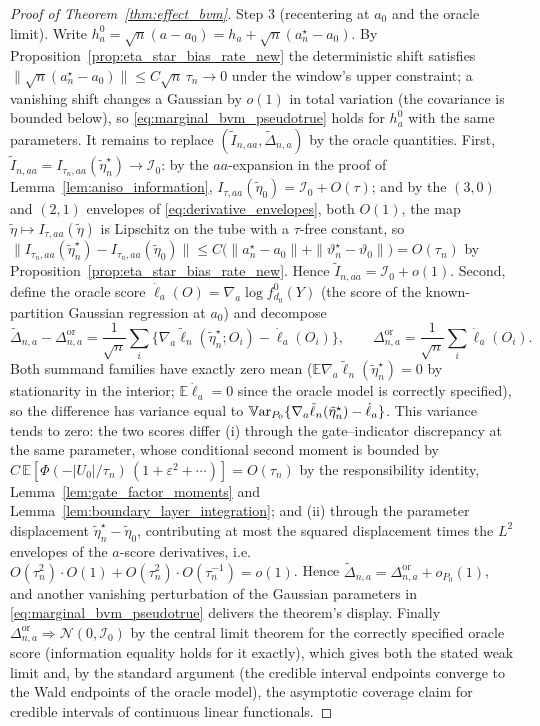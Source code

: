 \documentclass[11pt]{article}
\theoremstyle{definition}
\theoremstyle{plain}
\newcommand{\E}{\mathbb{E}}
\newcommand{\Var}{\mathbb{V}{\rm ar}}
\begin{document}
\begin{proof}[Proof of Theorem~\ref{thm:effect_bvm}]
Step 3 (recentering at $a_0$ and the oracle limit). Write $h_a^0=\sqrt n(a-a_0)=h_a+\sqrt n(a_n^\star-a_0)$. By Proposition~\ref{prop:eta_star_bias_rate_new} the deterministic shift satisfies $\|\sqrt n(a_n^\star-a_0)\|\le C\sqrt n\,\tau_n\to0$ under the window's upper constraint; a vanishing shift changes a Gaussian by $o(1)$ in total variation (the covariance is bounded below), so \eqref{eq:marginal_bvm_pseudotrue} holds for $h_a^0$ with the same parameters. It remains to replace $(\tilde I_{n,aa},\tilde\Delta_{n,a})$ by the oracle quantities. First, $\tilde I_{n,aa}=I_{\tau_n,aa}(\tilde\eta_n^\star)\to\mathcal I_0$: by the $aa$-expansion in the proof of Lemma~\ref{lem:aniso_information}, $I_{\tau,aa}(\tilde\eta_0)=\mathcal I_0+O(\tau)$; and by the $(3,0)$ and $(2,1)$ envelopes of \eqref{eq:derivative_envelopes}, both $O(1)$, the map $\tilde\eta\mapsto I_{\tau,aa}(\tilde\eta)$ is Lipschitz on the tube with a $\tau$-free constant, so
$\|I_{\tau_n,aa}(\tilde\eta_n^\star)-I_{\tau_n,aa}(\tilde\eta_0)\|\le C\big(\|a_n^\star-a_0\|+\|\vartheta_n^\star-\vartheta_0\|\big)=O(\tau_n)$
by Proposition~\ref{prop:eta_star_bias_rate_new}. Hence $\tilde I_{n,aa}=\mathcal I_0+o(1)$. Second, define the oracle score $\dot\ell_a(O)=\nabla_a\log f^0_{d_0}(Y)$ (the score of the known-partition Gaussian regression at $a_0$) and decompose
\[
\tilde\Delta_{n,a}-\Delta_{n,a}^{\mathrm{or}}
=\frac1{\sqrt n}\sum_i\big\{\nabla_a\tilde\ell_n(\tilde\eta_n^\star;O_i)-\dot\ell_a(O_i)\big\},
\qquad \Delta_{n,a}^{\mathrm{or}}=\frac1{\sqrt n}\sum_i\dot\ell_a(O_i).
\]
Both summand families have exactly zero mean ($\E\nabla_a\tilde\ell_n(\tilde\eta_n^\star)=0$ by stationarity in the interior; $\E\dot\ell_a=0$ since the oracle model is correctly specified), so the difference has variance equal to $\Var_{P_0}\{\nabla_a\tilde\ell_n(\tilde\eta_n^\star)-\dot\ell_a\}$. This variance tends to zero: the two scores differ (i) through the gate--indicator discrepancy at the same parameter, whose conditional second moment is bounded by $C\,\E[\Phi(-|U_0|/\tau_n)\,(1+\varepsilon^2+\cdots)]=O(\tau_n)$ by the responsibility identity, Lemma~\ref{lem:gate_factor_moments} and Lemma~\ref{lem:boundary_layer_integration}; and (ii) through the parameter displacement $\tilde\eta_n^\star-\tilde\eta_0$, contributing at most the squared displacement times the $L^2$ envelopes of the $a$-score derivatives, i.e.\ $O(\tau_n^2)\cdot O(1)+O(\tau_n^2)\cdot O(\tau_n^{-1})=o(1)$. Hence $\tilde\Delta_{n,a}=\Delta_{n,a}^{\mathrm{or}}+o_{P_0}(1)$, and another vanishing perturbation of the Gaussian parameters in \eqref{eq:marginal_bvm_pseudotrue} delivers the theorem's display. Finally $\Delta_{n,a}^{\mathrm{or}}\Rightarrow\mathcal N(0,\mathcal I_0)$ by the central limit theorem for the correctly specified oracle score (information equality holds for it exactly), which gives both the stated weak limit and, by the standard argument (the credible interval endpoints converge to the Wald endpoints of the oracle model), the asymptotic coverage claim for credible intervals of continuous linear functionals.
\end{proof}
\end{document}
